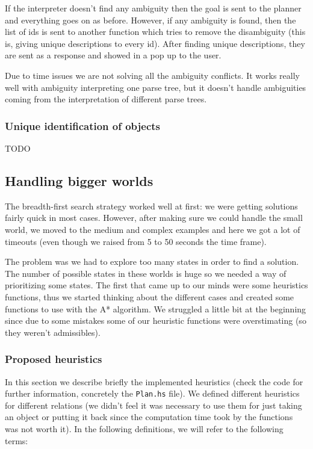 \documentclass[11pt]{article}
\begin{document}
          If the interpreter doesn't find any ambiguity then the goal is sent to the planner 
          and everything goes on as before. However, if any ambiguity is found, then the 
          list of ids is sent to another function which tries to remove the disambiguity 
          (this is, giving unique descriptions to every id). After finding unique 
          descriptions, they are sent as a response and showed in a pop up to the user.

          Due to time issues we are not solving all the ambiguity conflicts. It works really well
          with ambiguity interpreting one parse tree, but it doesn't handle ambiguities coming from 
          the interpretation of different parse trees.

          \subsubsection{Unique identification of objects}
          TODO

        \subsection{Handling bigger worlds}
        The breadth-first search strategy worked well at first: we were getting solutions 
        fairly quick in most cases. However, after making sure we could handle the small 
        world, we moved to the medium and complex examples and here we got a lot of 
        timeouts (even though we raised from 5 to 50 seconds the time frame).

        The problem was we had to explore too many states in order to find a solution. The 
        number of possible states in these worlds is huge so we needed a way of
        prioritizing some states. The first that came up to our minds were some
        heuristics functions, thus we started thinking about the different cases
        and created some functions to use with the A* algorithm. We struggled a little
        bit at the beginning since due to some mistakes some of our heuristic functions
        were overstimating (so they weren't admissibles).
        
        \subsubsection{Proposed heuristics}
        In this section we describe briefly the implemented heuristics (check the code for
         further information, concretely the \texttt{Plan.hs} file). We defined different 
         heuristics for different relations (we didn't feel it was necessary to use them 
         for just taking an object or putting it back since the computation time took by the
         functions was not worth it). In the following definitions, we will refer to the 
         following terms:
\end{document}
